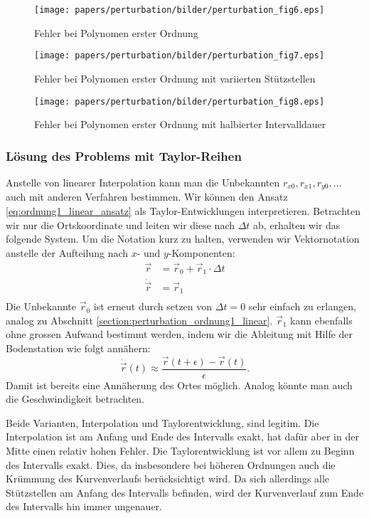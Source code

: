 \begin{figure}
	\centering
	\texttt{[image: papers/perturbation/bilder/perturbation\_fig6.eps]}
	\caption{Fehler bei Polynomen erster Ordnung}
	\label{fig:ordnung1_linear_error_A}
\end{figure}

\begin{figure}
	\centering
	\texttt{[image: papers/perturbation/bilder/perturbation\_fig7.eps]}
	\caption{Fehler bei Polynomen erster Ordnung mit variierten Stützstellen}
	\label{fig:ordnung1_linear_error_B}
\end{figure}

\begin{figure}
	\centering
	\texttt{[image: papers/perturbation/bilder/perturbation\_fig8.eps]}
	\caption{Fehler bei Polynomen erster Ordnung mit halbierter Intervalldauer}
	\label{fig:ordnung1_linear_error_C}
\end{figure}

\subsubsection{Lösung des Problems mit Taylor-Reihen}
Anstelle von linearer Interpolation kann man die Unbekannten $r_{x0}, r_{x1}, r_{y0}, \dots$ auch mit anderen Verfahren bestimmen.
Wir können den Ansatz \eqref{eq:ordnung1_linear_ansatz} als Taylor-Entwicklungen interpretieren.
Betrachten wir nur die Ortskoordinate und leiten wir diese nach $\Delta t$ ab, erhalten wir das folgende System.
Um die Notation kurz zu halten, verwenden wir Vektornotation anstelle der Aufteilung nach $x$- und $y$-Komponenten:
\begin{equation}
\label{eq:ordnung1_taylor_ansatz}
\begin{aligned}
\vec{r} &=  \vec{r}_0 + \vec{r}_1 \cdot \Delta t \\
\dot{\vec{r}} &= \vec{r}_1 \\
\end{aligned}
\end{equation}
Die Unbekannte $\vec{r}_0$ ist erneut durch setzen von $\Delta t = 0$ sehr einfach zu erlangen, analog zu Abschnitt \ref{section:perturbation_ordnung1_linear}.
$\vec{r}_1$ kann ebenfalls ohne grossen Aufwand bestimmt werden, indem wir die Ableitung mit Hilfe der Bodenstation wie folgt annähern:
\[
\dot{\vec{r}}(t) \approx \frac{\vec{r}(t+\epsilon) - \vec{r}(t)}{\epsilon}.
\]
Damit ist bereits eine Annäherung des Ortes möglich.
Analog könnte man auch die Geschwindigkeit betrachten.

Beide Varianten, Interpolation und Taylorentwicklung, sind legitim.
Die Interpolation ist am Anfang und Ende des Intervalls exakt, hat dafür aber in der Mitte einen relativ hohen Fehler.
Die Taylorentwicklung ist vor allem zu Beginn des Intervalls exakt.
Dies, da insbesondere bei höheren Ordnungen auch die Krümmung des Kurvenverlaufs berücksichtigt wird.
Da sich allerdings alle Stützstellen am Anfang des Intervalls befinden, wird der Kurvenverlauf zum Ende des Intervalls hin immer ungenauer.

